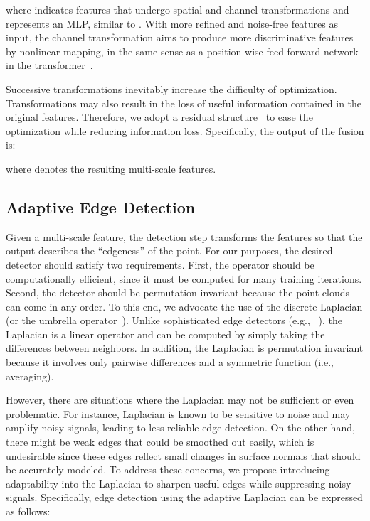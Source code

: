 \documentclass[sigconf]{acmart}
\begin{document}
where  indicates features that undergo spatial and channel transformations and  represents an MLP, similar to . 
With more refined and noise-free features as input, the channel transformation aims to produce more discriminative features by nonlinear mapping, in the same sense as a position-wise feed-forward network in the transformer~\cite{vaswani2017attention}.


Successive transformations inevitably increase the difficulty of optimization. Transformations may also result in the loss of useful information contained in the original features. 
Therefore, we adopt a residual structure~\cite{he2016deep} to ease the optimization while reducing information loss. 
Specifically, the output of the fusion is: 

where  denotes the resulting multi-scale features. 

\subsection{Adaptive Edge Detection}\label{sec: adaptive edge detection}



Given a multi-scale feature, the detection step transforms the features so that the output describes the ``edgeness'' of the point. For our purposes, the desired detector should satisfy two requirements. First, the operator should be computationally efficient, since it must be computed for many training iterations. Second, the detector should be permutation invariant because the point clouds can come in any order. 
To this end, we advocate the use of the discrete Laplacian (or the umbrella operator~\cite{taubin1995signal}).
Unlike sophisticated edge detectors (e.g., ~\cite{dollar2014fast}), the Laplacian is a linear operator and can be computed by simply taking the differences between neighbors. In addition, the Laplacian is permutation invariant because it involves only pairwise differences and a symmetric function (i.e., averaging).





However, there are situations where the Laplacian may not be sufficient or even problematic. For instance, Laplacian is known to be sensitive to noise and may amplify noisy signals, leading to less reliable edge detection. On the other hand, there might be weak edges that could be smoothed out easily, which is undesirable since these edges reflect small changes in surface normals that should be accurately modeled. To address these concerns, we propose introducing adaptability into the Laplacian to sharpen useful edges while suppressing noisy signals. Specifically, edge detection using the adaptive Laplacian can be expressed as follows:
\end{document}
